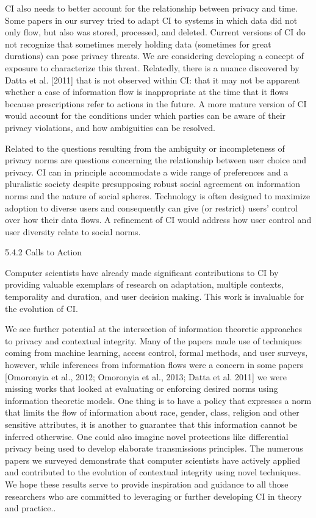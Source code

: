 \documentclass[../thesis.tex]{subfiles}
\begin{document}
\bigskip

CI also needs to better account for the relationship between privacy and
time. Some papers in our survey tried to adapt CI to systems in which
data did not only flow, but also was stored, processed, and
deleted.\textcolor[rgb]{0.2,0.2,0.2}{ Current versions of CI do not
recognize that sometimes }merely holding data (sometimes for great
durations) can pose privacy threats. We are considering developing a
concept of exposure to characterize this threat. Relatedly, there is a
nuance discovered by Datta et al. [2011] that is not observed within
CI: that it may not be apparent whether a case of information flow is
inappropriate at the time that it flows because prescriptions refer to
actions in the future. A more mature version of CI would account for
the conditions under which parties can be aware of their privacy
violations, and how ambiguities can be resolved.


\bigskip

Related to the questions resulting from the ambiguity or incompleteness
of privacy norms are questions concerning the relationship between user
choice and privacy. CI can in principle accommodate a wide range of
preferences and a pluralistic society despite presupposing robust
social agreement on information norms and the nature of social spheres.
Technology is often designed to maximize adoption to diverse users and
consequently can give (or restrict) users' control over
how their data flows. A refinement of CI would address how user control
and user diversity relate to social norms.

{\color[rgb]{0.2627451,0.2627451,0.2627451}
5.4.2 Calls to Action}

Computer scientists have already made significant contributions to CI by
providing valuable exemplars of research on adaptation, multiple
contexts, temporality and duration, and user decision making. This work
is invaluable for the evolution of CI.


\bigskip

We see further potential at the intersection of information theoretic
approaches to privacy and contextual integrity. Many of the papers made
use of techniques coming from machine learning, access control, formal
methods, and user surveys, however, while inferences from information
flows were a concern in some papers [Omoronyia et al., 2012; Omoronyia
et al., 2013; Datta et al. 2011] we were missing works that looked at
evaluating or enforcing desired norms using information theoretic
models. One thing is to have a policy that expresses a norm that limits
the flow of information about race, gender, class, religion and other
sensitive attributes, it is another to guarantee that this information
cannot be inferred otherwise. One could also imagine novel protections
like differential privacy being used to develop elaborate transmissions
principles. The numerous papers we surveyed demonstrate that computer
scientists have actively applied and contributed to the evolution of
contextual integrity using novel techniques. We hope these results
serve to provide inspiration and guidance to all those researchers who
are committed to leveraging or further developing CI in theory and
practice..\ \ 
\end{document}
